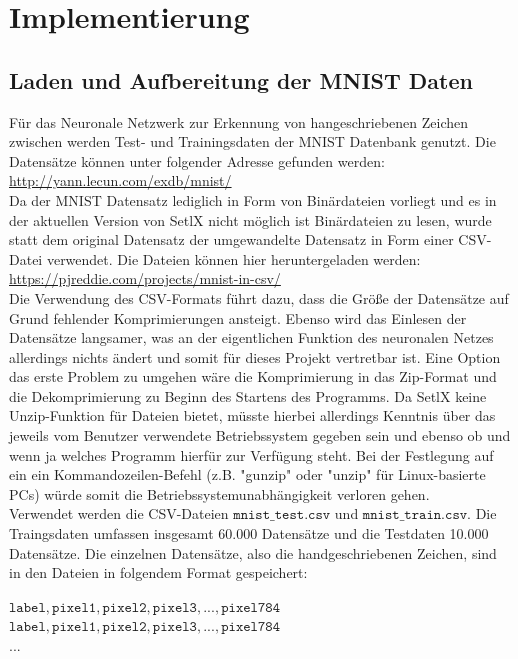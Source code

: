 \chapter{Implementierung}

\section{Laden und Aufbereitung der MNIST Daten}
Für das Neuronale Netzwerk zur Erkennung von hangeschriebenen Zeichen zwischen werden Test- und Trainingsdaten der MNIST Datenbank genutzt. Die Datensätze können unter folgender Adresse gefunden werden: 
\\[0.2cm]
\hspace*{1.3cm}
\href{http://yann.lecun.com/exdb/mnist/}{http://yann.lecun.com/exdb/mnist/}
\\[0.2cm]
Da der MNIST Datensatz lediglich in Form von Binärdateien vorliegt und es in der aktuellen Version von SetlX nicht möglich ist Binärdateien zu lesen, wurde statt dem original Datensatz der umgewandelte Datensatz in Form einer CSV-Datei verwendet. Die Dateien können hier heruntergeladen werden:
\\[0.2cm]
\hspace*{1.3cm}
\href{https://pjreddie.com/projects/mnist-in-csv/}{https://pjreddie.com/projects/mnist-in-csv/}
\\[0.2cm]
Die Verwendung des CSV-Formats führt dazu, dass die Größe der Datensätze auf Grund fehlender Komprimierungen ansteigt. Ebenso wird das Einlesen der Datensätze langsamer, was an der eigentlichen Funktion des neuronalen Netzes allerdings nichts ändert und somit für dieses Projekt vertretbar ist. Eine Option das erste Problem zu umgehen wäre die Komprimierung in das Zip-Format und die Dekomprimierung zu Beginn des Startens des Programms. Da SetlX keine Unzip-Funktion für Dateien bietet, müsste hierbei allerdings Kenntnis über das jeweils vom Benutzer verwendete Betriebssystem gegeben sein und ebenso ob und wenn ja welches Programm hierfür zur Verfügung steht. Bei der Festlegung auf ein ein Kommandozeilen-Befehl (z.B. "gunzip" oder "unzip" für Linux-basierte PCs) würde somit die Betriebssystemunabhängigkeit verloren gehen.\\
Verwendet werden die CSV-Dateien $\mathtt{mnist\_test.csv}$ und $\mathtt{mnist\_train.csv}$. Die Traingsdaten umfassen insgesamt 60.000 Datensätze und die Testdaten 10.000 Datensätze. 
Die einzelnen Datensätze, also die handgeschriebenen Zeichen, sind in den Dateien in folgendem Format gespeichert:
\begin{center}
	$\mathtt{label, pixel1, pixel2, pixel3, ..., pixel784}$ \\
	$\mathtt{label, pixel1, pixel2, pixel3, ..., pixel784}$ \\
	...
\end{center}
